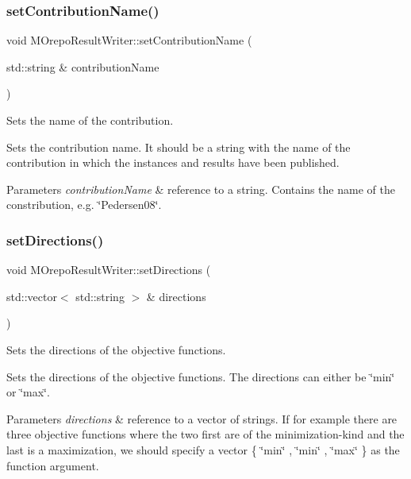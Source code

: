 \subsubsection{\texorpdfstring{set\+Contribution\+Name()}{setContributionName()}}
{\footnotesize\ttfamily void M\+Orepo\+Result\+Writer\+::set\+Contribution\+Name (\begin{DoxyParamCaption}\item[{std\+::string \&}]{contribution\+Name }\end{DoxyParamCaption})\hspace{0.3cm}{\ttfamily [inline]}}



Sets the name of the contribution. 

Sets the contribution name. It should be a string with the name of the contribution in which the instances and results have been published. 
\begin{DoxyParams}{Parameters}
{\em contribution\+Name} & reference to a string. Contains the name of the constribution, e.\+g. \char`\"{}\+Pedersen08\char`\"{}. \\
\hline
\end{DoxyParams}
\mbox{\label{class_m_orepo_result_writer_a6c67d6025d87c81e261bfbf051e71c89}} 
\subsubsection{\texorpdfstring{set\+Directions()}{setDirections()}}
{\footnotesize\ttfamily void M\+Orepo\+Result\+Writer\+::set\+Directions (\begin{DoxyParamCaption}\item[{std\+::vector$<$ std\+::string $>$ \&}]{directions }\end{DoxyParamCaption})\hspace{0.3cm}{\ttfamily [inline]}}



Sets the directions of the objective functions. 

Sets the directions of the objective functions. The directions can either be \char`\"{}min\char`\"{} or \char`\"{}max\char`\"{}. 
\begin{DoxyParams}{Parameters}
{\em directions} & reference to a vector of strings. If for example there are three objective functions where the two first are of the minimization-\/kind and the last is a maximization, we should specify a vector \{ \char`\"{}min\char`\"{} , \char`\"{}min\char`\"{} , \char`\"{}max\char`\"{} \} as the function argument. \\
\hline
\end{DoxyParams}
\mbox{\label{class_m_orepo_result_writer_a25d3f1385b1062e5ff94e02019033df7}} 
